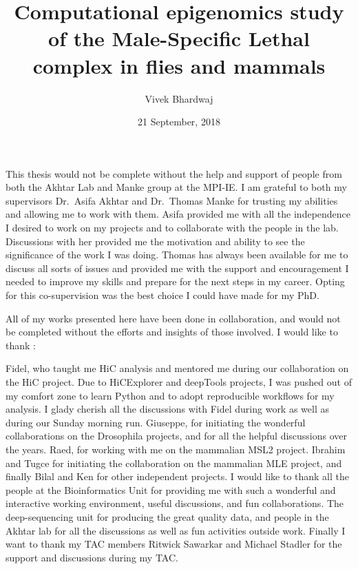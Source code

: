 \documentclass[11pt,twoside]{MPIthesis}
\title{Computational epigenomics study of the Male-Specific Lethal complex in
flies and mammals}
\author{Vivek Bhardwaj}
\date{21 September, 2018}
\theoremstyle{definition}
\theoremstyle{definition}
\theoremstyle{definition}
\theoremstyle{remark}
\begin{document}
  \maketitle

\makepagetwo

\frontmatter %
\pagestyle{empty} %
  \begin{acknowledgements}
    This thesis would not be complete without the help and support of people
    from both the Akhtar Lab and Manke group at the MPI-IE. I am grateful to
    both my supervisors Dr.~Asifa Akhtar and Dr.~Thomas Manke for trusting
    my abilities and allowing me to work with them. Asifa provided me with
    all the independence I desired to work on my projects and to collaborate
    with the people in the lab. Discussions with her provided me the
    motivation and ability to see the significance of the work I was doing.
    Thomas has always been available for me to discuss all sorts of issues
    and provided me with the support and encouragement I needed to improve
    my skills and prepare for the next steps in my career. Opting for this
    co-supervision was the best choice I could have made for my PhD.
    
    All of my works presented here have been done in collaboration, and
    would not be completed without the efforts and insights of those
    involved. I would like to thank :
    
    Fidel, who taught me HiC analysis and mentored me during our
    collaboration on the HiC project. Due to HiCExplorer and deepTools
    projects, I was pushed out of my comfort zone to learn Python and to
    adopt reproducible workflows for my analysis. I glady cherish all the
    discussions with Fidel during work as well as during our Sunday morning
    run. Giuseppe, for initiating the wonderful collaborations on the
    Drosophila projects, and for all the helpful discussions over the years.
    Raed, for working with me on the mammalian MSL2 project. Ibrahim and
    Tugce for initiating the collaboration on the mammalian MLE project, and
    finally Bilal and Ken for other independent projects. I would like to
    thank all the people at the Bioinformatics Unit for providing me with
    such a wonderful and interactive working environment, useful
    discussions, and fun collaborations. The deep-sequencing unit for
    producing the great quality data, and people in the Akhtar lab for all
    the discussions as well as fun activities outside work. Finally I want
    to thank my TAC members Ritwick Sawarkar and Michael Stadler for the
    support and discussions during my TAC.
  \end{acknowledgements}
  \hypersetup{linkcolor=black}
  \setcounter{tocdepth}{2}
  \tableofcontents
\end{document}
